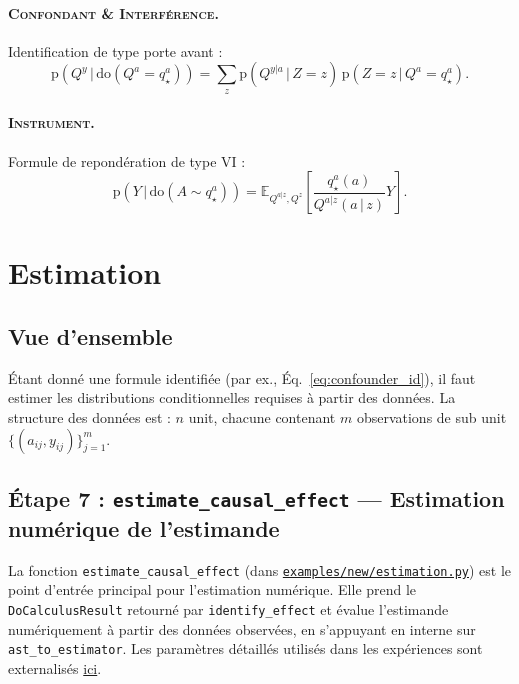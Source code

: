 \documentclass[11pt,a4paper]{article}
\newcommand{\EE}[2]{\mathbb{E}_{#1}\left[ #2 \right]}
\newcommand{\rmdo}{\mathrm{do}}
\newcommand{\g}{\,\vert\,}
\newcommand{\pr}{\mathrm{p}}
\begin{document}
\paragraph{\textsc{Confondant \& Interférence}.}
Identification de type porte avant :
\begin{equation}
  \pr(Q^y \g \rmdo(Q^a = q^a_\star)) = \sum_{z} \pr(Q^{y|a} \g Z=z)\, \pr(Z=z \g Q^a = q^a_\star).
  \label{eq:interference_id}
\end{equation}

\paragraph{\textsc{Instrument}.}
Formule de repondération de type VI :
\begin{equation}
  \pr(Y \g \rmdo(A \sim q^a_\star)) = \EE{Q^{a|z}, Q^z}{\frac{q^a_\star(a)}{Q^{a|z}(a \g z)} Y}.
  \label{eq:instrument_id}
\end{equation}

\section{Estimation}
\label{sec:estimation}

\subsection{Vue d'ensemble}

Étant donné une formule identifiée (par ex., Éq.~\eqref{eq:confounder_id}), il faut estimer les distributions conditionnelles requises à partir des données.
La structure des données est : $n$ unit, chacune contenant $m$ observations de sub unit $\{(a_{ij}, y_{ij})\}_{j=1}^m$.

\subsection{Étape 7 : \texttt{estimate\_causal\_effect} --- Estimation numérique de l'estimande}

La fonction \texttt{estimate\_causal\_effect} (dans \href{https://github.com/janisaiad/hierarchicalcausalmodels/blob/main/examples/new/estimation.py}{\texttt{examples/new/estimation.py}}) est le point d'entrée principal pour l'estimation numérique.
Elle prend le \texttt{DoCalculusResult} retourné par \texttt{identify\_effect} et évalue l'estimande numériquement à partir des données observées, en s'appuyant en interne sur \texttt{ast\_to\_estimator}.
Les paramètres détaillés utilisés dans les expériences sont externalisés \href{https://github.com/janisaiad/hierarchicalcausalmodels/blob/main/examples/STAR/params.md}{ici}.
\end{document}
